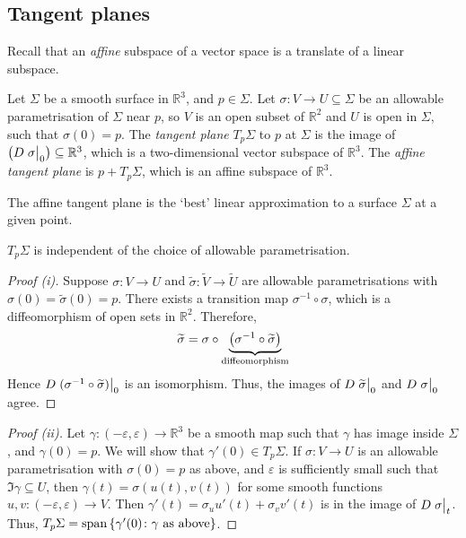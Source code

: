 \subsection{Tangent planes}
Recall that an \textit{affine} subspace of a vector space is a translate of a linear subspace.
\begin{definition}
	Let \( \Sigma \) be a smooth surface in \( \mathbb R^3 \), and \( p \in \Sigma \).
	Let \( \sigma \colon V \to U \subseteq \Sigma \) be an allowable parametrisation of \( \Sigma \) near \( p \), so \( V \) is an open subset of \( \mathbb R^2 \) and \( U \) is open in \( \Sigma \), such that \( \sigma(0) = p \).
	The \textit{tangent plane} \( T_p \Sigma \) to \( p \) at \( \Sigma \) is the image of \( \qty(D \eval{\sigma}_0) \subseteq \mathbb R^3 \), which is a two-dimensional vector subspace of \( \mathbb R^3 \).
	The \textit{affine tangent plane} is \( p + T_p \Sigma \), which is an affine subspace of \( \mathbb R^3 \).
\end{definition}
\begin{remark}
	The affine tangent plane is the `best' linear approximation to a surface \( \Sigma \) at a given point.
\end{remark}
\begin{lemma}
	\( T_p \Sigma \) is independent of the choice of allowable parametrisation.
\end{lemma}
\begin{proof}[Proof (i)]
	Suppose \( \sigma \colon V \to U \) and \( \widetilde \sigma \colon \widetilde V \to \widetilde U \) are allowable parametrisations with \( \sigma(0) = \widetilde \sigma(0) = p \).
	There exists a transition map \( \sigma^{-1} \circ \sigma \), which is a diffeomorphism of open sets in \( \mathbb R^2 \).
	Therefore,
	\[
		\widetilde \sigma = \sigma \circ \underbrace{\qty(\sigma^{-1} \circ \widetilde \sigma)}_{\text{diffeomorphism}}
	\]
	Hence \( D\eval{(\sigma^{-1} \circ \widetilde \sigma)}_{0} \) is an isomorphism.
	Thus, the images of \( D \eval{\widetilde \sigma}_0 \) and \( D \eval{\sigma}_0 \) agree.
\end{proof}
\begin{proof}[Proof (ii)]
	Let \( \gamma \colon (-\varepsilon, \varepsilon) \to \mathbb R^3 \) be a smooth map such that \( \gamma \) has image inside \( \Sigma \), and \( \gamma(0) = p \).
	We will show that \( \gamma'(0) \in T_p \Sigma \).
	If \( \sigma \colon V \to U \) is an allowable parametrisation with \( \sigma(0) = p \) as above, and \( \varepsilon \) is sufficiently small such that \( \Im \gamma \subseteq U \), then \( \gamma(t) = \sigma(u(t), v(t)) \) for some smooth functions \( u, v \colon (-\varepsilon, \varepsilon) \to V \).
	Then \( \gamma'(t) = \sigma_u u'(t) + \sigma_v v'(t) \) is in the image of \( D \eval{\sigma}_t \).
	Thus, \( T_p \Sigma = \operatorname{span} \qty{ \gamma'(0) \colon \gamma \text{ as above} } \).
\end{proof}
